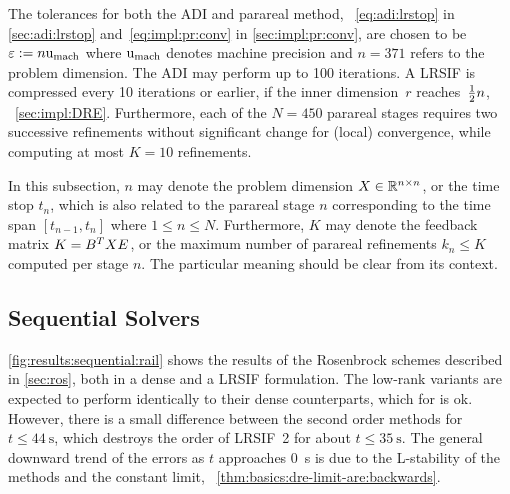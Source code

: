 The tolerances for both the \ac{ADI} and parareal method,
\cf~\eqref{eq:adi:lrstop} in \autoref{sec:adi:lrstop}
and~\eqref{eq:impl:pr:conv} in \autoref{sec:impl:pr:conv},
are chosen to be $\varepsilon := n\mathrm u_\text{mach}$
where $\mathrm u_\text{mach}$ denotes machine precision
and $n=371$ refers to the problem dimension.
The \ac{ADI} may perform up to 100 iterations.
A \ac{LRSIF} is compressed every 10 iterations or earlier,
if the inner dimension~$r$ reaches~$\tfrac{1}{2} n$,
\cf~\autoref{sec:impl:DRE}.
Furthermore, each of the $N = 450$ parareal stages requires two successive refinements without significant change
for (local) convergence,
while computing at most $K = 10$ refinements.

\begin{remark}
  In this subsection,
  $n$ may denote the problem dimension $X \in\mathbb{R}^{n\times n}$,
  or the time stop $t_n$,
  which is also related to the parareal stage $n$ corresponding to the time span $[t_{n-1}, t_n]$
  where $1 \leq n \leq N$.
  Furthermore,
  $K$ may denote the feedback matrix \mbox{$K = B^T X E$},
  or the maximum number of parareal refinements $k_n \leq K$ computed per stage $n$.
  The particular meaning should be clear from its context.
\end{remark}

\subsection{Sequential Solvers}

\autoref{fig:results:sequential:rail} shows the results of the Rosenbrock schemes described in \autoref{sec:ros},
both in a dense and a \ac{LRSIF} formulation.
The low-rank variants are expected to perform identically to their dense counterparts,
which for  is ok.
However, there is a small difference between the second order methods for $t\leq\SI{44}{\second}$,
which destroys the order of \ac{LRSIF}~2 for about $t\leq\SI{35}{\second}$.
The general downward trend of the errors as $t$ approaches \SI{0}{\second} is due to the L-stability of the methods and the constant limit,
\cf~\autoref{thm:basics:dre-limit-are:backwards}.

